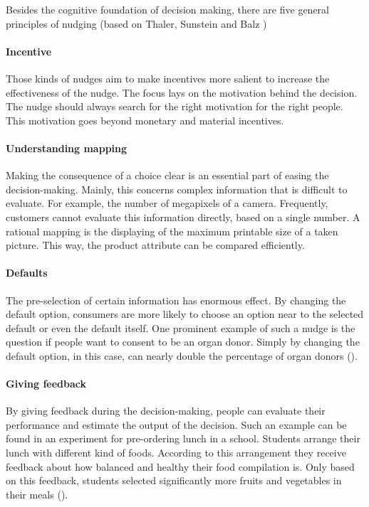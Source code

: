 Besides the cognitive foundation of decision making, there are five general principles of nudging (based on Thaler, Sunstein and Balz \citeyear{thaler_choice_2010})
\paragraph{Incentive}
Those kinds of nudges aim to make incentives more salient to increase the effectiveness of the nudge. The focus lays on the motivation behind the decision. The nudge should always search for the right motivation for the right people. This motivation goes beyond monetary and material incentives.
\paragraph{Understanding mapping}
Making the consequence of a choice clear is an essential part of easing the decision-making. Mainly, this concerns complex information that is difficult to evaluate. For example, the number of megapixels of a camera. Frequently, customers cannot evaluate this information directly, based on a single number. A rational mapping is the displaying of the maximum printable size of a taken picture. This way, the product attribute can be compared efficiently.
\paragraph{Defaults}
The pre-selection of certain information has enormous effect. By changing the default option, consumers are more likely to choose an option near to the selected default or even the default itself. One prominent example of such a nudge is the question if people want to consent to be an organ donor. Simply by changing the default option, in this case, can nearly double the percentage of organ donors (\cite{johnson_defaults_2003}). 
\paragraph{Giving feedback}
By giving feedback during the decision-making, people can evaluate their performance and estimate the output of the decision. Such an example can be found in an experiment for pre-ordering lunch in a school. Students arrange their lunch with different kind of foods. According to this arrangement they receive feedback about how balanced and healthy their food compilation is. Only based on this feedback, students selected significantly more fruits and vegetables in their meals (\cite{miller_effects_2016}).
